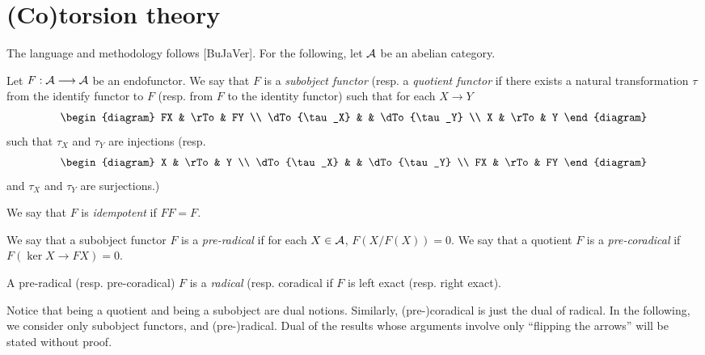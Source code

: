 \section{(Co)torsion theory}

The language and methodology follows [BuJaVer]. For the 
following, let $\mathcal{A}$ be an abelian category.

\begin{definition}
Let $F: \mathcal{A} \longrightarrow \mathcal{A}$ be an endofunctor. We say that
$F$ is a \emph{subobject functor} (resp. a \emph{quotient functor}
if there exists a natural transformation $\tau$ from the identify
functor to $F$ (resp. from $F$ to the identity functor) such that 
for each $X \to Y$
\[
\begin{diagram}
FX           & \rTo & FY           \\
\dTo{\tau_X} &      & \dTo{\tau_Y} \\
X            & \rTo & Y
\end{diagram}
\]
such that $\tau_X$ and $\tau_Y$ are injections (resp. 
\[
\begin{diagram}
X            & \rTo & Y            \\
\dTo{\tau_X} &      & \dTo{\tau_Y} \\
FX           & \rTo & FY
\end{diagram}
\]
and $\tau_X$ and $\tau_Y$ are surjections.)
\end{definition}

\begin{definition}
We say that $F$ is \emph{idempotent} if $FF = F$.
\end{definition}

\begin{definition}
We say that a subobject functor $F$ is a \emph{pre-radical} 
if for each $X \in \mathcal{A}$, $F(X/F(X)) = 0$. We say that a 
quotient $F$ is a \emph{pre-coradical} if $F(\ker X \to FX) = 0$.
\end{definition}

\begin{definition}
A pre-radical (resp. pre-coradical) $F$ is a \emph{radical} (resp. 
coradical if $F$ is left exact (resp. right exact).
\end{definition}

\begin{rmk}
Notice that being a quotient and being a subobject are dual 
notions. Similarly, (pre-)coradical is just the dual of radical. 
In the following, we consider only subobject functors, and 
(pre-)radical. Dual of the results whose arguments involve only 
``flipping the arrows'' will be stated without proof.
\end{rmk}

